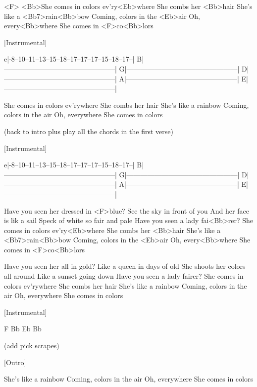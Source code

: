 

\zr
<F>    <Bb>She comes in colors ev'ry<Eb>where
She combs her <Bb>hair
She's like a <Bb7>rain<Bb>bow
Coming, colors in the <Eb>air
Oh, every<Bb>where
She comes in <F>co<Bb>lors
\kr

[Instrumental]
                                                      
e|-8--10--11--13--15--18--17--17--17--15--18--17--| 
B|------------------------------------------------|  
G|------------------------------------------------|  
D|------------------------------------------------|
A|------------------------------------------------|
E|------------------------------------------------|

\zs
She comes in colors ev'rywhere
She combs her hair
She's like a rainbow
Coming, colors in the air
Oh, everywhere
She comes in colors          
\ks

(back to intro plus play all the chords
in the first verse)


[Instrumental]
                                                      
e|-8--10--11--13--15--18--17--17--17--15--18--17--| 
B|------------------------------------------------|  
G|------------------------------------------------|  
D|------------------------------------------------|
A|------------------------------------------------|
E|------------------------------------------------|


\zs
Have you seen her dressed in <F>blue?
See the sky in front of you
And her face is lik a sail
Speck of white so fair and pale
Have you seen a lady fai<Bb>rer?
She comes in colors ev'ry<Eb>where
She combs her <Bb>hair
She's like a <Bb7>rain<Bb>bow
Coming, colors in the <Eb>air
Oh, every<Bb>where
She comes in <F>co<Bb>lors
\ks

\zs
Have you seen her all in gold?
Like a queen in days of old
She shoots her colors all around
Like a sunset going down
Have you seen a lady fairer?
She comes in colors ev'rywhere
She combs her hair
She's like a rainbow
Coming, colors in the air
Oh, everywhere
She comes in colors      
\ks

[Instrumental]
                                                      
F  Bb    Eb   Bb

(add pick scrapes)


[Outro]

She's like a rainbow
Coming, colors in the air
Oh, everywhere
She comes in colors
\kp

